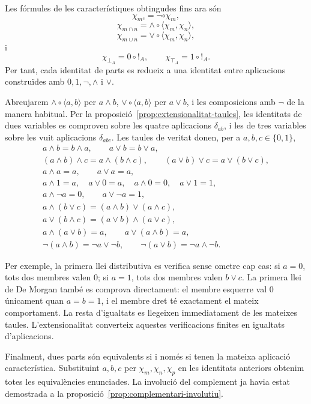 \begin{prova}
Les fórmules de les característiques obtingudes fins ara són
\[
\chi_{m^c}=\neg\circ\chi_m,
\]
\[
\chi_{m\cap n}
=\wedge\circ\langle\chi_m,\chi_n\rangle,
\]
\[
\chi_{m\cup n}
=\vee\circ\langle\chi_m,\chi_n\rangle,
\]
i
\[
\chi_{\bot_A}=0\circ {!}_A,
\qquad
\chi_{\top_A}=1\circ {!}_A.
\]
Per tant, cada identitat de parts es redueix a una identitat entre
aplicacions construïdes amb
\(0,1,\neg,\wedge\) i \(\vee\).

Abreujarem \(\wedge\circ\langle a,b\rangle\) per \(a\wedge b\),
\(\vee\circ\langle a,b\rangle\) per \(a\vee b\), i les
composicions amb \(\neg\) de la manera habitual.
Per la proposició~\ref{prop:extensionalitat-taules}, les identitats de
dues variables es comproven sobre les quatre aplicacions
\(\delta_{ab}\), i les de tres variables sobre les vuit aplicacions
\(\delta_{abc}\). Les taules de veritat donen, per a
\(a,b,c\in\{0,1\}\),
\[
\begin{gathered}
a\wedge b=b\wedge a,
\qquad
a\vee b=b\vee a,\\
(a\wedge b)\wedge c=a\wedge(b\wedge c),
\qquad
(a\vee b)\vee c=a\vee(b\vee c),\\
a\wedge a=a,
\qquad
a\vee a=a,\\
a\wedge1=a,
\quad
a\vee0=a,
\quad
a\wedge0=0,
\quad
a\vee1=1,\\
a\wedge\neg a=0,
\qquad
a\vee\neg a=1,\\
a\wedge(b\vee c)
=(a\wedge b)\vee(a\wedge c),\\
a\vee(b\wedge c)
=(a\vee b)\wedge(a\vee c),\\
a\wedge(a\vee b)=a,
\qquad
a\vee(a\wedge b)=a,\\
\neg(a\wedge b)=\neg a\vee\neg b,
\qquad
\neg(a\vee b)=\neg a\wedge\neg b.
\end{gathered}
\]

Per exemple, la primera llei distributiva es verifica sense ometre cap
cas: si \(a=0\), tots dos membres valen \(0\); si \(a=1\), tots dos
membres valen \(b\vee c\). La primera llei de De Morgan també es
comprova directament: el membre esquerre val \(0\) únicament quan
\(a=b=1\), i el membre dret té exactament el mateix comportament. La
resta d'igualtats es llegeixen immediatament de les mateixes taules.
L'extensionalitat converteix aquestes verificacions finites en
igualtats d'aplicacions.

Finalment, dues parts són equivalents si i només si tenen la mateixa
aplicació característica. Substituint \(a,b,c\) per
\(\chi_m,\chi_n,\chi_p\) en les identitats anteriors obtenim totes les
equivalències enunciades. La involució del complement ja havia estat
demostrada a la proposició~\ref{prop:complementari-involutiu}.
\end{prova}

